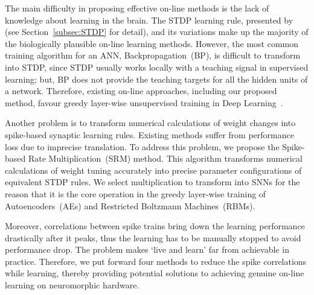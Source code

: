 \DIFaddbegin 

\DIFaddend %

The main difficulty in proposing effective on-line methods is the lack of knowledge about learning in the brain.
The STDP learning rule, presented by~\citet{bi1998synaptic} (see Section~\ref{subsec:STDP} for detail), and its variations make up the majority of the biologically plausible on-line learning methods.
However, the most common training algorithm for an ANN, Backpropagation~(BP), is difficult to transform into STDP, since STDP usually works locally with a teaching signal in supervised learning; but, BP does not provide the teaching targets for all the hidden units of a network.
Therefore, existing on-line approaches, including our proposed method, favour greedy layer-wise unsupervised training in Deep Learning~\citep{hinton2006fast}.

Another problem is to transform numerical calculations of weight changes into spike-based synaptic learning rules.
Existing methods suffer from performance loss due to imprecise translation.
To address this problem, we propose the Spike-based Rate Multiplication~(SRM) method.
This algorithm transforms numerical calculations of weight tuning accurately into precise parameter configurations of equivalent STDP rules.
We select multiplication to transform into SNNs for the reason that it is the core operation in the greedy layer-wise training of Autoencoders~(AEs) and Restricted Boltzmann Machines~(RBMs).

Moreover, correlations between spike trains bring down the learning performance drastically after it peaks, thus the learning has to be manually stopped to avoid performance drop.
The problem makes `live and learn' far from achievable in practice.
Therefore, we put forward four methods to reduce the spike correlations while learning, thereby providing potential solutions to achieving genuine on-line learning on neuromorphic hardware.










